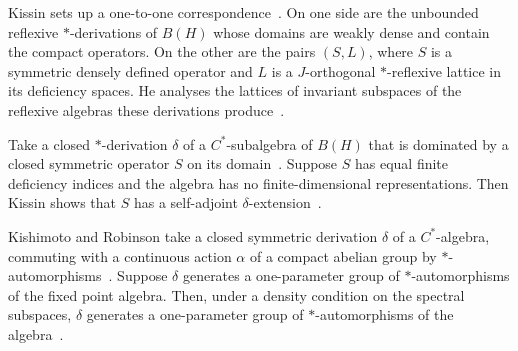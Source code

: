 Kissin sets up a one-to-one correspondence~\cite{WlReflexiveStarDerivationsAndLat2006}. On one side are the unbounded
reflexive
$*$-derivations of $B(H)$ whose domains are weakly dense and contain the
compact operators. On the other are the pairs $(S,L)$, where $S$ is a
symmetric densely defined
operator and $L$ is a $J$-orthogonal $*$-reflexive lattice in its deficiency
spaces. He analyses the lattices of invariant subspaces of the reflexive
algebras these derivations
produce~\cite{WlReflexiveStarDerivationsAndLat2006}.

Take a closed $*$-derivation $\delta$ of a $C^*$-subalgebra of $B(H)$ that is
dominated by a closed symmetric operator $S$ on its domain~\cite{WlSymmetricOperatorExtensionsOfU1988}. Suppose $S$ has
equal finite deficiency indices and the algebra has no
finite-dimensional representations. Then Kissin shows that $S$ has a
self-adjoint
$\delta$-extension~\cite{WlSymmetricOperatorExtensionsOfU1988}.

Kishimoto and Robinson take a closed symmetric derivation $\delta$ of
a $C^*$-algebra, commuting with a continuous action $\alpha$ of a compact
abelian group by $*$-automorphisms~\cite{WlOnUnboundedDerivationsCommutin1982}. Suppose $\delta$ generates a one-parameter
group of
$*$-automorphisms of the fixed point algebra. Then, under a density condition
on the spectral subspaces, $\delta$ generates a one-parameter group of
$*$-automorphisms of the algebra~\cite{WlOnUnboundedDerivationsCommutin1982}.
